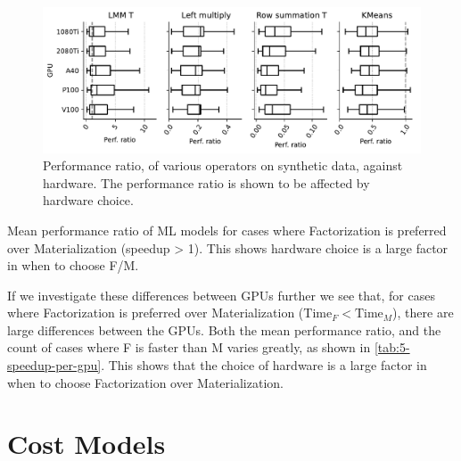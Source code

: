 \begin{figure}[ht]
    \centering
    \includegraphics[width=\linewidth]{chapters/05_cost_estimation/figures/motivation_speedup_per_operator_per_gpu.pdf}
    \caption[Performance ratio plotted against hardware]{Performance ratio, of various operators on synthetic data, against hardware. The performance ratio is shown to be affected by hardware choice. }
    \label{fig:5-gpu-characteristics}
\end{figure}

\begin{table}[ht]
    \centering
    
    \caption[Performance ratio of ML models for cases where factorization has positive impact.]{Mean performance ratio of ML models for cases where Factorization is preferred over Materialization (speedup > 1). This shows hardware choice is a large factor in when to choose F/M. }
    \label{tab:5-speedup-per-gpu}
\end{table}

If we investigate these differences between GPUs further we see that, for cases where Factorization is preferred over Materialization ($\text{Time}_F < \text{Time}_M$), there are large differences between the GPUs. Both the mean performance ratio, and the count of cases where F is faster than M varies greatly, as shown in \autoref{tab:5-speedup-per-gpu}. This shows that the choice of hardware is a large factor in when to choose Factorization over Materialization.



\section{Cost Models}
\label{sec:5-cost-models}

